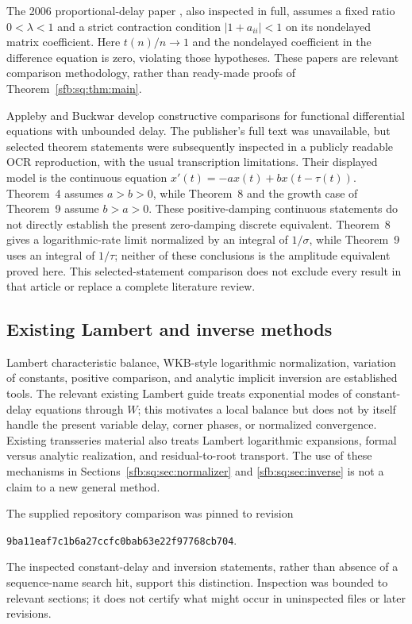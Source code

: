 \documentclass[11pt]{article}
\theoremstyle{remark}\newtheorem{remark}[theorem]{Remark}
\begin{document}
The 2006 proportional-delay paper \cite{kundrat06}, also inspected in full, assumes a fixed ratio $0<\lambda<1$ and a strict contraction condition $|1+a_{ii}|<1$ on its nondelayed matrix coefficient. Here $t(n)/n\to1$ and the nondelayed coefficient in the difference equation is zero, violating those hypotheses. These papers are relevant comparison methodology, rather than ready-made proofs of Theorem~\ref{sfb:sq:thm:main}.

Appleby and Buckwar \cite{applebybuckwar} develop constructive comparisons for functional differential equations with unbounded delay. The publisher's full text was unavailable, but selected theorem statements were subsequently inspected in a publicly readable OCR reproduction, with the usual transcription limitations. Their displayed model is the continuous equation $x'(t)=-ax(t)+b x(t-\tau(t))$. Theorem~4 assumes $a>b>0$, while Theorem~8 and the growth case of Theorem~9 assume $b>a>0$. These positive-damping continuous statements do not directly establish the present zero-damping discrete equivalent. Theorem~8 gives a logarithmic-rate limit normalized by an integral of $1/\sigma$, while Theorem~9 uses an integral of $1/\tau$; neither of these conclusions is the amplitude equivalent proved here. This selected-statement comparison does not exclude every result in that article or replace a complete literature review.

\subsection{Existing Lambert and inverse methods}
Lambert characteristic balance, WKB-style logarithmic normalization, variation of constants, positive comparison, and analytic implicit inversion are established tools. The relevant existing Lambert guide \cite{lambertguide} treats exponential modes of constant-delay equations through $W$; this motivates a local balance but does not by itself handle the present variable delay, corner phases, or normalized convergence. Existing transseries material \cite{transseriesguide,inversionguide} also treats Lambert logarithmic expansions, formal versus analytic realization, and residual-to-root transport. The use of these mechanisms in Sections~\ref{sfb:sq:sec:normalizer} and \ref{sfb:sq:sec:inverse} is not a claim to a new general method.

The supplied repository comparison was pinned to revision
\begin{center}\texttt{9ba11eaf7c1b6a27ccfc0bab63e22f97768cb704}.\end{center} The inspected constant-delay and inversion statements, rather than absence of a sequence-name search hit, support this distinction. Inspection was bounded to relevant sections; it does not certify what might occur in uninspected files or later revisions.
\end{document}
